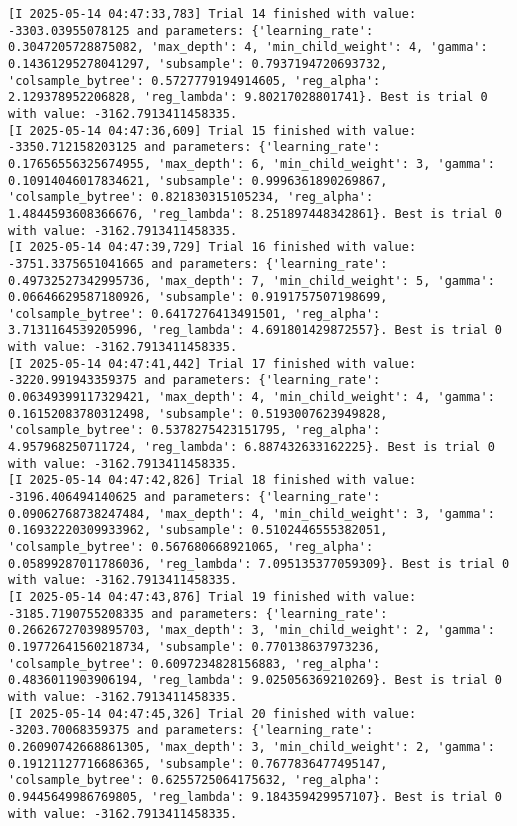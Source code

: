 \documentclass[
  letterpaper,
  DIV=11,
  numbers=noendperiod]{scrreprt}
\begin{document}
\begin{verbatim}
[I 2025-05-14 04:47:33,783] Trial 14 finished with value: -3303.03955078125 and parameters: {'learning_rate': 0.3047205728875082, 'max_depth': 4, 'min_child_weight': 4, 'gamma': 0.14361295278041297, 'subsample': 0.7937194720693732, 'colsample_bytree': 0.5727779194914605, 'reg_alpha': 2.129378952206828, 'reg_lambda': 9.80217028801741}. Best is trial 0 with value: -3162.7913411458335.
[I 2025-05-14 04:47:36,609] Trial 15 finished with value: -3350.712158203125 and parameters: {'learning_rate': 0.17656556325674955, 'max_depth': 6, 'min_child_weight': 3, 'gamma': 0.10914046017834621, 'subsample': 0.9996361890269867, 'colsample_bytree': 0.821830315105234, 'reg_alpha': 1.4844593608366676, 'reg_lambda': 8.251897448342861}. Best is trial 0 with value: -3162.7913411458335.
[I 2025-05-14 04:47:39,729] Trial 16 finished with value: -3751.3375651041665 and parameters: {'learning_rate': 0.49732527342995736, 'max_depth': 7, 'min_child_weight': 5, 'gamma': 0.06646629587180926, 'subsample': 0.9191757507198699, 'colsample_bytree': 0.6417276413491501, 'reg_alpha': 3.7131164539205996, 'reg_lambda': 4.691801429872557}. Best is trial 0 with value: -3162.7913411458335.
[I 2025-05-14 04:47:41,442] Trial 17 finished with value: -3220.991943359375 and parameters: {'learning_rate': 0.06349399117329421, 'max_depth': 4, 'min_child_weight': 4, 'gamma': 0.16152083780312498, 'subsample': 0.5193007623949828, 'colsample_bytree': 0.5378275423151795, 'reg_alpha': 4.957968250711724, 'reg_lambda': 6.887432633162225}. Best is trial 0 with value: -3162.7913411458335.
[I 2025-05-14 04:47:42,826] Trial 18 finished with value: -3196.406494140625 and parameters: {'learning_rate': 0.09062768738247484, 'max_depth': 4, 'min_child_weight': 3, 'gamma': 0.16932220309933962, 'subsample': 0.5102446555382051, 'colsample_bytree': 0.567680668921065, 'reg_alpha': 0.05899287011786036, 'reg_lambda': 7.095135377059309}. Best is trial 0 with value: -3162.7913411458335.
[I 2025-05-14 04:47:43,876] Trial 19 finished with value: -3185.7190755208335 and parameters: {'learning_rate': 0.26626727039895703, 'max_depth': 3, 'min_child_weight': 2, 'gamma': 0.19772641560218734, 'subsample': 0.770138637973236, 'colsample_bytree': 0.6097234828156883, 'reg_alpha': 0.4836011903906194, 'reg_lambda': 9.025056369210269}. Best is trial 0 with value: -3162.7913411458335.
[I 2025-05-14 04:47:45,326] Trial 20 finished with value: -3203.70068359375 and parameters: {'learning_rate': 0.26090742668861305, 'max_depth': 3, 'min_child_weight': 2, 'gamma': 0.19121127716686365, 'subsample': 0.7677836477495147, 'colsample_bytree': 0.6255725064175632, 'reg_alpha': 0.9445649986769805, 'reg_lambda': 9.184359429957107}. Best is trial 0 with value: -3162.7913411458335.

\end{verbatim}
\end{document}
